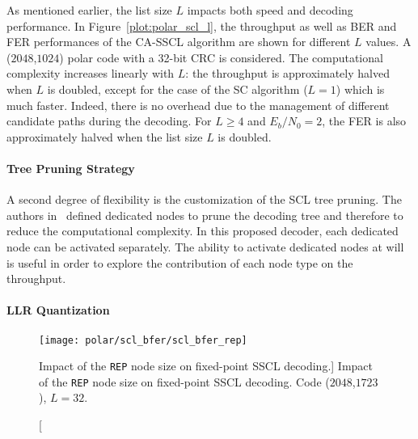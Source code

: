 As mentioned earlier, the list size $L$ impacts both speed and decoding
performance. In Figure~\ref{plot:polar_scl_l}, the throughput as well as BER and
FER performances of the CA-SSCL algorithm are shown for different $L$ values. A
($2048$,$1024$) polar code with a 32-bit CRC is considered. The computational
complexity increases linearly with $L$: the throughput is approximately halved
when $L$ is doubled, except for the case of the SC algorithm ($L=1$) which is
much faster. Indeed, there is no overhead due to the management of different
candidate paths during the decoding. For $L\geq4$ and $E_b/N_0=2$, the FER is
also approximately halved when the list size $L$ is doubled.

\paragraph{Tree Pruning Strategy}

A second degree of flexibility is the customization of the SCL tree pruning. The
authors in~\cite{Alamdar-Yazdi2011,Sarkis2016} defined dedicated nodes to prune
the decoding tree and therefore to reduce the computational complexity. In this
proposed decoder, each dedicated node can be activated separately. The ability
to activate dedicated nodes at will is useful in order to explore the
contribution of each node type on the throughput.

\paragraph{LLR Quantization}

\begin{figure}[htp]
  \centering
  \texttt{[image: polar/scl\_bfer/scl\_bfer\_rep]}
  \caption
    [Impact of the \texttt{REP} node size on fixed-point SSCL decoding.]
    {Impact of the \texttt{REP} node size on fixed-point SSCL decoding.
    Code ($2048$,$1723$), $L=32$.}
  \label{plot:polar_scl_bfer_rep}
\end{figure}


